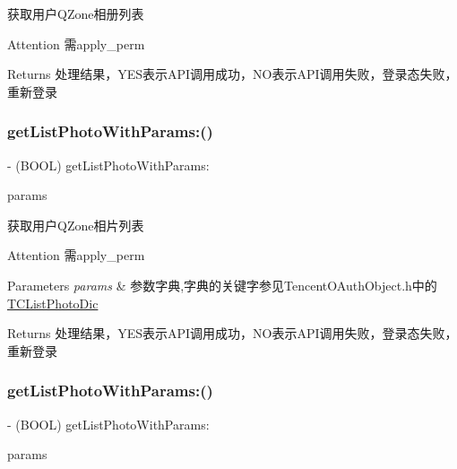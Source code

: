 获取用户\+Q\+Zone相册列表 \begin{DoxyAttention}{Attention}
需apply\+\_\+perm 
\end{DoxyAttention}
\begin{DoxyReturn}{Returns}
处理结果，\+Y\+E\+S表示\+A\+P\+I调用成功，\+N\+O表示\+A\+P\+I调用失败，登录态失败，重新登录 
\end{DoxyReturn}
\mbox{\label{interface_tencent_o_auth_ae60ab4bbb851f267106ee4889e5d9f81}} 
\subsubsection{\texorpdfstring{get\+List\+Photo\+With\+Params\+:()}{getListPhotoWithParams:()}\hspace{0.1cm}{\footnotesize\ttfamily [1/2]}}
{\footnotesize\ttfamily -\/ (B\+O\+OL) get\+List\+Photo\+With\+Params\+: \begin{DoxyParamCaption}\item[{(N\+S\+Mutable\+Dictionary $\ast$)}]{params }\end{DoxyParamCaption}}

获取用户\+Q\+Zone相片列表 \begin{DoxyAttention}{Attention}
需apply\+\_\+perm 
\end{DoxyAttention}

\begin{DoxyParams}{Parameters}
{\em params} & 参数字典,字典的关键字参见\+Tencent\+O\+Auth\+Object.\+h中的\mbox{\hyperlink{interface_t_c_list_photo_dic}{T\+C\+List\+Photo\+Dic}} \\
\hline
\end{DoxyParams}
\begin{DoxyReturn}{Returns}
处理结果，\+Y\+E\+S表示\+A\+P\+I调用成功，\+N\+O表示\+A\+P\+I调用失败，登录态失败，重新登录 
\end{DoxyReturn}
\mbox{\label{interface_tencent_o_auth_ae60ab4bbb851f267106ee4889e5d9f81}} 
\subsubsection{\texorpdfstring{get\+List\+Photo\+With\+Params\+:()}{getListPhotoWithParams:()}\hspace{0.1cm}{\footnotesize\ttfamily [2/2]}}
{\footnotesize\ttfamily -\/ (B\+O\+OL) get\+List\+Photo\+With\+Params\+: \begin{DoxyParamCaption}\item[{(N\+S\+Mutable\+Dictionary $\ast$)}]{params }\end{DoxyParamCaption}}

